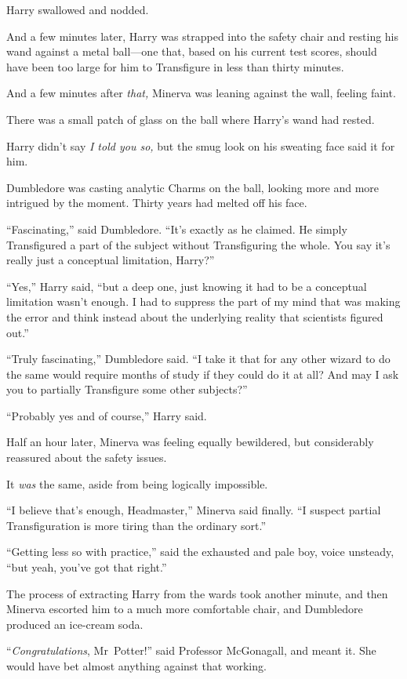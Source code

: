 Harry swallowed and nodded.

And a few minutes later, Harry was strapped into the safety chair and resting his wand against a metal ball—one that, based on his current test scores, should have been too large for him to Transfigure in less than thirty minutes.

And a few minutes after \emph{that,} Minerva was leaning against the wall, feeling faint.

There was a small patch of glass on the ball where Harry’s wand had rested.

Harry didn’t say \emph{I told you so,} but the smug look on his sweating face said it for him.

Dumbledore was casting analytic Charms on the ball, looking more and more intrigued by the moment. Thirty years had melted off his face.

“Fascinating,” said Dumbledore. “It’s exactly as he claimed. He simply Transfigured a part of the subject without Transfiguring the whole. You say it’s really just a conceptual limitation, Harry?”

“Yes,” Harry said, “but a deep one, just knowing it had to be a conceptual limitation wasn’t enough. I had to suppress the part of my mind that was making the error and think instead about the underlying reality that scientists figured out.”

“Truly fascinating,” Dumbledore said. “I take it that for any other wizard to do the same would require months of study if they could do it at all? And may I ask you to partially Transfigure some other subjects?”

“Probably yes and of course,” Harry said.

Half an hour later, Minerva was feeling equally bewildered, but considerably reassured about the safety issues.

It \emph{was} the same, aside from being logically impossible.

“I believe that’s enough, Headmaster,” Minerva said finally. “I suspect partial Transfiguration is more tiring than the ordinary sort.”

“Getting less so with practice,” said the exhausted and pale boy, voice unsteady, “but yeah, you’ve got that right.”

The process of extracting Harry from the wards took another minute, and then Minerva escorted him to a much more comfortable chair, and Dumbledore produced an ice-cream soda.

“\emph{Congratulations}, Mr~Potter!” said Professor McGonagall, and meant it. She would have bet almost anything against that working.

